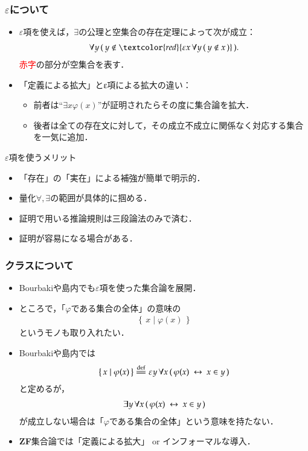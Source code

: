 \documentclass[dvipdfmx,10pt,notheorems]{beamer}
\theoremstyle{definition}
\newcommand{\Set}[2]{\left\{\, #1 \mid #2\, \right\}} %
\newcommand{\defeq}{\overset{\mathrm{def}}{=\joinrel=}} %
\newcommand{\lrarrow}{\hspace{0.25em}\leftrightarrow\hspace{0.25em}} %
\begin{document}
\begin{frame}\frametitle{$\varepsilon$について}
	\begin{itemize}
		\item $\varepsilon$項を使えば，$\exists$の公理と空集合の存在定理によって次が成立：
			\begin{align}
				\forall y\, (\, y \notin \textcolor{red}{\varepsilon x\, \forall y\, (\, y \notin x\, )}\, ).
			\end{align}
			\textcolor{red}{赤字}の部分が空集合を表す．
			
		\item 「定義による拡大」とε項による拡大の違い：
			\begin{itemize}
				\item 前者は``$\exists x \varphi(x)$''が証明されたらその度に集合論を拡大．
				\item 後者は全ての存在文に対して，その成立不成立に関係なく対応する集合を一気に追加．
			\end{itemize}
	\end{itemize}
	
	\begin{block}{$\varepsilon$項を使うメリット}
		\begin{itemize}
			\item 「存在」の「実在」による補強が簡単で明示的．
			\item 量化$\forall,\exists$の範囲が具体的に掴める．
			\item 証明で用いる推論規則は三段論法のみで済む．
			\item 証明が容易になる場合がある．
		\end{itemize}
	\end{block}
\end{frame}

\begin{frame}\frametitle{クラスについて}
	\begin{itemize}
		\item Bourbaki\cite{Bourbaki}や島内\cite{Shimauchi}でも$\varepsilon$項を使った集合論を展開．
		
		\item ところで，「$\varphi$である集合の全体」の意味の
			\begin{align}
				\Set{x}{\varphi(x)}
			\end{align}
			というモノも取り入れたい．
		
		\item Bourbaki\cite{Bourbaki}や島内\cite{Shimauchi}では
			\begin{align}
				\Set{x}{\varphi(x)} \defeq \varepsilon y\, \forall x\, 
				(\, \varphi(x) \lrarrow x \in y\, )
			\end{align}
			と定めるが，
			\begin{align}
				\exists y\, \forall x\, (\, \varphi(x) \lrarrow x \in y\, )
			\end{align}
			が成立しない場合は「$\varphi$である集合の全体」という意味を持たない．
		
		\item {\bf ZF}集合論では「定義による拡大」 or インフォーマルな導入．
	\end{itemize}
\end{frame}
\end{document}
